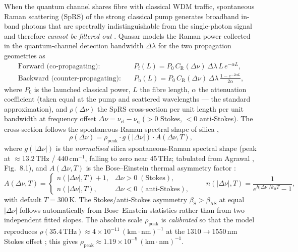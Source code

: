 \documentclass[11pt]{article}
\begin{document}
When the quantum channel shares fibre with classical WDM traffic, spontaneous Raman
scattering (SpRS) of the strong classical pump generates broadband in-band photons that are
spectrally indistinguishable from the single-photon signal and therefore \emph{cannot be
filtered out} \cite{townsend1997,eraerds2010}. Quasar models the Raman power collected in the
quantum-channel detection bandwidth $\Delta\lambda$ for the two propagation geometries as
\cite{dasilva2014,peters2009}
\begin{align}
\text{Forward (co-propagating):}\quad & P_{\mathrm{f}}(L)=P_0\,C_{\mathrm{R}}(\Delta\nu)\,\Delta\lambda\,L\,e^{-\alpha L},\\
\text{Backward (counter-propagating):}\quad & P_{\mathrm{b}}(L)=P_0\,C_{\mathrm{R}}(\Delta\nu)\,\Delta\lambda\,\frac{1-e^{-2\alpha L}}{2\alpha},
\end{align}
where $P_0$ is the launched classical power, $L$ the fibre length, $\alpha$ the attenuation
coefficient (taken equal at the pump and scattered wavelengths --- the standard approximation),
and $\rho(\Delta\nu)$ the SpRS cross-section per unit length per unit bandwidth at frequency
offset $\Delta\nu = \nu_{\mathrm{cl}}-\nu_{\mathrm{q}}$ ($>0$ Stokes, $<0$ anti-Stokes).
The cross-section follows the spontaneous-Raman spectral shape of silica
\cite{dasilva2014,agrawal2019},
\begin{equation}
\boxed{\;\rho(\Delta\nu)=\rho_{\mathrm{peak}}\cdot g(|\Delta\nu|)\cdot A(\Delta\nu,T),\;}
\end{equation}
where $g(|\Delta\nu|)$ is the \emph{normalised} silica spontaneous-Raman spectral shape (peak
at ${\approx}13.2\,\mathrm{THz}$ / $440\,\mathrm{cm}^{-1}$, falling to zero near
$45\,\mathrm{THz}$; tabulated from Agrawal \cite{agrawal2019}, Fig.~8.1), and
$A(\Delta\nu,T)$ is the Bose--Einstein thermal asymmetry factor \cite{boyd2020}:
\begin{equation}
A(\Delta\nu,T)=\begin{cases}
n(|\Delta\nu|,T)+1, & \Delta\nu>0\;(\text{Stokes}),\\[2pt]
n(|\Delta\nu|,T), & \Delta\nu<0\;(\text{anti-Stokes}),
\end{cases}
\qquad
n(|\Delta\nu|,T)=\frac{1}{e^{h|\Delta\nu|/k_{\mathrm{B}}T}-1},
\end{equation}
with default $T=300\,\mathrm{K}$.  The Stokes/anti-Stokes asymmetry $\beta_{\mathrm{S}} >
\beta_{\mathrm{AS}}$ at equal $|\Delta\nu|$ follows automatically from Bose--Einstein
statistics rather than from two independent fitted slopes.  The absolute scale
$\rho_{\mathrm{peak}}$ is \emph{calibrated} so that the model reproduces
$\rho(35.4\,\mathrm{THz})\approx4\times10^{-11}\,\mathrm{(km\cdot nm)}^{-1}$ at the
$1310\to1550\,\mathrm{nm}$ Stokes offset \cite{eraerds2010,dasilva2014}; this gives
$\rho_{\mathrm{peak}}\approx1.19\times10^{-9}\,\mathrm{(km\cdot nm)}^{-1}$.
\end{document}
